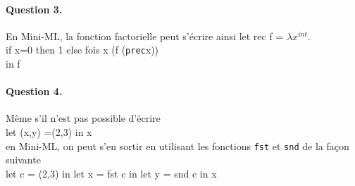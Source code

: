 \documentclass{article}
\theoremstyle{thm}
\theoremstyle{def}
\theoremstyle{dem}
\newcommand{\code}[1]{\texttt{#1}}
\begin{document}
	\paragraph{Question 3.}
	En Mini-ML, la fonction factorielle peut s'écrire ainsi
	let rec f = $\lambda x^{int}$.\\
	if x=0 then 1 else fois x (f (\code{prec}x))\\
	in f\\

	\paragraph{Question 4.}
	Même s'il n'est pas possible d'écrire\\
	let (x,y) =(2,3) in x\\
	en Mini-ML, on peut s'en sortir en utilisant les fonctions \code{fst} et \code{snd} de la façon suivante\\
	let c = (2,3) in let x = fst c in let y = snd c in x
\end{document}
